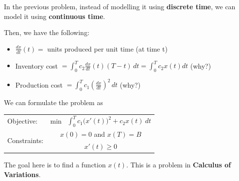 \documentclass{workbook}
\begin{document}
\begin{slide}
\question \label{q:cv}

In the previous problem, instead of modelling it using \textbf{discrete time}, we can model it using \textbf{continuous time}.

Then, we have the following:
\begin{itemize}
	\item $\frac{dx}{dt}(t) = $ units produced per unit time (at time t)
	\item Inventory cost $\displaystyle= \int_0^T c_2 \frac{dx}{dt}(t) (T-t) \, dt = \int_0^T c_2 x(t) dt$ \hfill (why?)
	\item Production cost $\displaystyle= \int_0^T c_1 \left(\frac{dx}{dt}\right)^2 \, dt$
		\hfill (why?)
\end{itemize}
We can formulate the problem as
\begin{problem}
\begin{tabular}[t]{lc}
	Objective: 						& min \ $\displaystyle\int_0^T c_1 \big(x'(t)\big)^2 + c_2 x(t) ~dt$ \\[10pt]
	\multirow{2}{*}{Constraints:} 	& $x(0)=0$ and $x(T)=B$ \\
				& $x'(t) \geq 0$
\end{tabular}

The goal here is to find a function $x(t)$. This is a problem in \textbf{Calculus of Variations}.
\end{problem}


\end{slide}
\end{document}
